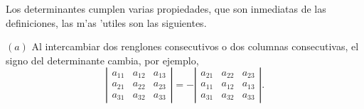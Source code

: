 \noindent Los determinantes cumplen varias propiedades, que son inmediatas de las definiciones, las m'as 'utiles son las siguientes.
\begin{propiedades}
$(a)$\; Al intercambiar dos renglones consecutivos o dos columnas consecutivas, el signo del determinante cambia, por ejemplo,
$$
     \left |\begin{array}{ccc}
                 a_{11} &  a_{12} &a_{13}\\[1mm]
                 a_{21} &  a_{22}&a_{23}\\[1mm]
		 a_{31} &  a_{32}&a_{33}
              \end{array}\right |= -
     \left |\begin{array}{ccc}
                 a_{21} &  a_{22}&a_{23}\\[1mm]
                 a_{11} &  a_{12} &a_{13}\\[1mm]
		 a_{31} &  a_{32}&a_{33}
              \end{array}\right |.
$$	      


\end{propiedades}
